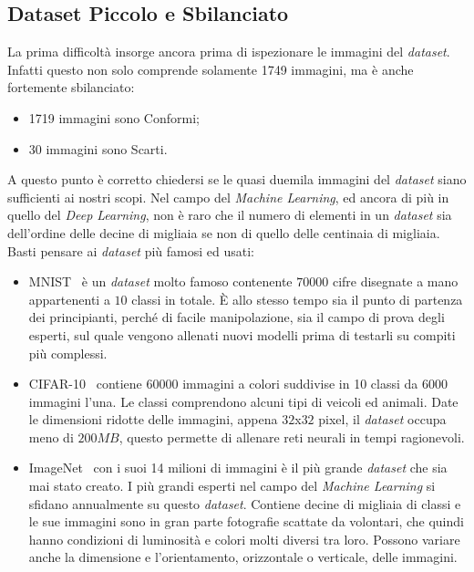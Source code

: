 \subsection{Dataset Piccolo e Sbilanciato}
La prima difficoltà insorge ancora prima di ispezionare le immagini del \textit{dataset}.
Infatti questo non solo comprende solamente 1749 immagini, ma è anche fortemente sbilanciato:
\begin{itemize}
    \item 1719 immagini sono Conformi;
    \item 30 immagini sono Scarti.
\end{itemize}
A questo punto è corretto chiedersi se le quasi duemila immagini del \textit{dataset} siano sufficienti ai nostri scopi.
Nel campo del \textit{Machine Learning}, ed ancora di più in quello del \textit{Deep Learning}, non è raro che il numero di elementi in un \textit{dataset} sia dell'ordine delle decine di migliaia se non di quello delle centinaia di migliaia.
Basti pensare ai \textit{dataset} più famosi ed usati:
\begin{itemize}
  \item MNIST~\cite{mnist} è un \textit{dataset} molto famoso contenente $70000$ cifre disegnate a mano appartenenti a $10$ classi in totale.
    È allo stesso tempo sia il punto di partenza dei principianti, perché di facile manipolazione, sia il campo di prova degli esperti, sul quale vengono allenati nuovi modelli prima di testarli su compiti più complessi.

  \item CIFAR-10~\cite{cifar} contiene $60000$ immagini a colori suddivise in 10 classi da 6000 immagini l'una.
    Le classi comprendono alcuni tipi di veicoli ed animali.
    Date le dimensioni ridotte delle immagini, appena $32$x$32$ pixel, il \textit{dataset} occupa meno di $200 MB$, questo permette di allenare reti neurali in tempi ragionevoli.

 \item ImageNet~\cite{imagenet} con i suoi 14 milioni di immagini è il più grande \textit{dataset} che sia mai stato creato.
    I più grandi esperti nel campo del \textit{Machine Learning} si sfidano annualmente su questo \textit{dataset}.
    Contiene decine di migliaia di classi e le sue immagini sono in gran parte fotografie scattate da volontari, che quindi hanno condizioni di luminosità e colori molti diversi tra loro.
    Possono variare anche la dimensione e l'orientamento, orizzontale o verticale, delle immagini.

\end{itemize}

